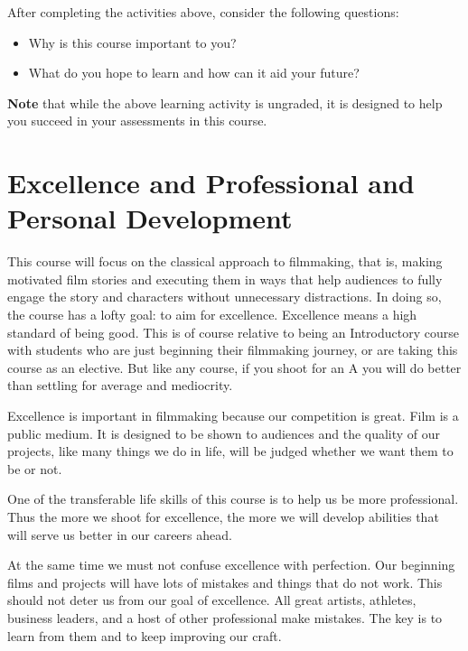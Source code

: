 \documentclass[
]{book}
\providecommand{\tightlist}{%
  \setlength{\itemsep}{0pt}\setlength{\parskip}{0pt}}
\begin{document}
\begin{reflect}
After completing the activities above, consider the following questions:

\begin{itemize}
\tightlist
\item
  Why is this course important to you?\\
\item
  What do you hope to learn and how can it aid your future?
\end{itemize}
\end{reflect}

\begin{caution}
\textbf{Note} that while the above learning activity is ungraded, it is designed to help you succeed in your assessments in this course.
\end{caution}

\hypertarget{excellence-and-professional-and-personal-development}{%
\section{Excellence and Professional and Personal Development}\label{excellence-and-professional-and-personal-development}}

This course will focus on the classical approach to filmmaking, that is, making motivated film stories and executing them in ways that help audiences to fully engage the story and characters without unnecessary distractions. In doing so, the course has a lofty goal: to aim for excellence. Excellence means a high standard of being good. This is of course relative to being an Introductory course with students who are just beginning their filmmaking journey, or are taking this course as an elective. But like any course, if you shoot for an A you will do better than settling for average and mediocrity.

Excellence is important in filmmaking because our competition is great. Film is a public medium. It is designed to be shown to audiences and the quality of our projects, like many things we do in life, will be judged whether we want them to be or not.

One of the transferable life skills of this course is to help us be more professional. Thus the more we shoot for excellence, the more we will develop abilities that will serve us better in our careers ahead.

At the same time we must not confuse excellence with perfection. Our beginning films and projects will have lots of mistakes and things that do not work. This should not deter us from our goal of excellence. All great artists, athletes, business leaders, and a host of other professional make mistakes. The key is to learn from them and to keep improving our craft.
\end{document}

